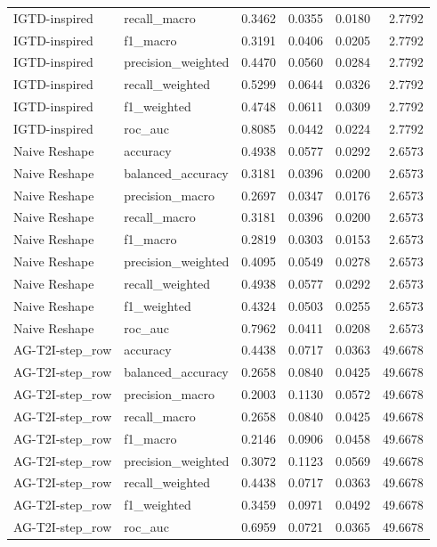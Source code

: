 \begin{tabular}{llrrrr}
IGTD-inspired & recall_macro & 0.3462 & 0.0355 & 0.0180 & 2.7792 \\
IGTD-inspired & f1_macro & 0.3191 & 0.0406 & 0.0205 & 2.7792 \\
IGTD-inspired & precision_weighted & 0.4470 & 0.0560 & 0.0284 & 2.7792 \\
IGTD-inspired & recall_weighted & 0.5299 & 0.0644 & 0.0326 & 2.7792 \\
IGTD-inspired & f1_weighted & 0.4748 & 0.0611 & 0.0309 & 2.7792 \\
IGTD-inspired & roc_auc & 0.8085 & 0.0442 & 0.0224 & 2.7792 \\
Naive Reshape & accuracy & 0.4938 & 0.0577 & 0.0292 & 2.6573 \\
Naive Reshape & balanced_accuracy & 0.3181 & 0.0396 & 0.0200 & 2.6573 \\
Naive Reshape & precision_macro & 0.2697 & 0.0347 & 0.0176 & 2.6573 \\
Naive Reshape & recall_macro & 0.3181 & 0.0396 & 0.0200 & 2.6573 \\
Naive Reshape & f1_macro & 0.2819 & 0.0303 & 0.0153 & 2.6573 \\
Naive Reshape & precision_weighted & 0.4095 & 0.0549 & 0.0278 & 2.6573 \\
Naive Reshape & recall_weighted & 0.4938 & 0.0577 & 0.0292 & 2.6573 \\
Naive Reshape & f1_weighted & 0.4324 & 0.0503 & 0.0255 & 2.6573 \\
Naive Reshape & roc_auc & 0.7962 & 0.0411 & 0.0208 & 2.6573 \\
AG-T2I-step_row & accuracy & 0.4438 & 0.0717 & 0.0363 & 49.6678 \\
AG-T2I-step_row & balanced_accuracy & 0.2658 & 0.0840 & 0.0425 & 49.6678 \\
AG-T2I-step_row & precision_macro & 0.2003 & 0.1130 & 0.0572 & 49.6678 \\
AG-T2I-step_row & recall_macro & 0.2658 & 0.0840 & 0.0425 & 49.6678 \\
AG-T2I-step_row & f1_macro & 0.2146 & 0.0906 & 0.0458 & 49.6678 \\
AG-T2I-step_row & precision_weighted & 0.3072 & 0.1123 & 0.0569 & 49.6678 \\
AG-T2I-step_row & recall_weighted & 0.4438 & 0.0717 & 0.0363 & 49.6678 \\
AG-T2I-step_row & f1_weighted & 0.3459 & 0.0971 & 0.0492 & 49.6678 \\
AG-T2I-step_row & roc_auc & 0.6959 & 0.0721 & 0.0365 & 49.6678 \\

\end{tabular}
